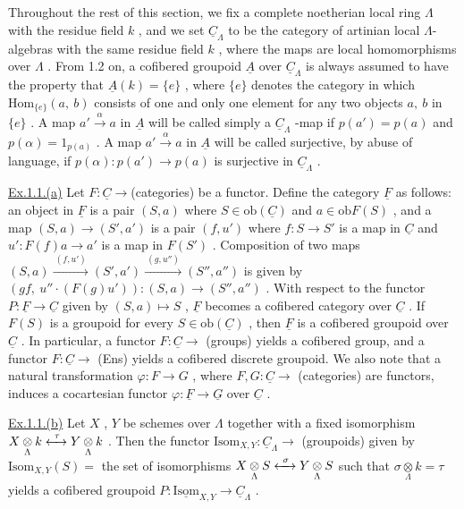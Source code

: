 Throughout the rest of this section, we fix a complete noetherian local ring  $\Lambda$  with the residue field  $k$  , and we set  $\underline{C}_{\Lambda}$  to be the category of artinian local  $\Lambda$-algebras with the same residue field  $k$  , where the maps are local homomorphisms over  $\Lambda$  . From 1.2 on, a cofibered groupoid  $\underline{A}$  over  $\underline{C}_{\Lambda}$ is always assumed to have the property that  $\underline{A}(k) = \{e\}$  , where  $\{e\}$  denotes the category in which  $\mathrm{Hom}_{\{e\}}(a,\ b)$  consists of one and only one element for any  two objects  $a,\ b$  in  $\{e\}$  . A map  $a' \xrightarrow{\ \alpha\ } a$  in  $\underline{A}$  will be called simply a $\underline{C}_{\Lambda}$ -map if  $p(a') = p(a)$  and  $p(\alpha) = 1_{p(a)}$  . A map  $a' \xrightarrow{\ \alpha\ } a$  in  $\underline{A}$  will be called surjective, by abuse of language, if  $p(\alpha) : p(a') \longrightarrow p(a)$  is surjective in  $\underline{C}_{\Lambda}$  .

\underline{Ex.1.1.(a)}  Let  $F : \underline{C} \longrightarrow$(categories) be a functor. Define the category $\underline{F}$  as follows:  an object in  $\underline{F}$  is a pair  $(S,a)$  where  $S \in \mathrm{ob}(\underline{C})$  and $a \in \mathrm{ob}F(S)$  , and a map  $(S,a) \to (S',a')$  is a pair  $(f,u')$  where  $f : S \to S'$  is a map in  $\underline{C}$  and  $u' : F(f)a \to a'$  is a map in  $F(S')$  . Composition of two maps $(S,a) \xrightarrow{\ (f,u')\ } (S',a') \xrightarrow{\ (g,u'')\ } (S'',a'')$  is given by $(gf,\ u''\cdot(F(g)u')) : (S,a) \to (S'',a'')$  . With respect to the functor  $P : \underline{F} \to \underline{C}$ given by  $(S,a) \mapsto S$  ,  $\underline{F}$  becomes a cofibered category over  $\underline{C}$  . If  $F(S)$  is a groupoid for every  $S \in \mathrm{ob}(\underline{C})$  , then  $\underline{F}$  is a cofibered groupoid over  $\underline{C}$  . In particular, a functor  $F : \underline{C} \to$ (groups) yields a cofibered group, and a functor $F : \underline{C} \to$ (Ens)  yields a cofibered discrete groupoid. We also note that a natural transformation  $\varphi : F \to G$  , where  $F,G : \underline{C} \to$ (categories) are functors, induces a cocartesian functor  $\varphi : \underline{F} \to \underline{G}$  over  $\underline{C}$  .

\underline{Ex.1.1.(b)}  Let  $X$  ,  $Y$  be schemes over  $\Lambda$  together with a fixed
isomorphism  $X \underset{\Lambda}{\otimes} k \xleftrightarrow{\ \tau\ } Y \underset{\Lambda}{\otimes} k$  . Then the functor  $\mathrm{Isom}_{X,Y} : \underline{C}_{\Lambda} \to$ (groupoids) given by  $\mathrm{Isom}_{X,Y}(S) =$ the set of isomorphisms  $X \underset{\Lambda}{\otimes} S \xleftrightarrow{\ \sigma\ } Y \underset{\Lambda}{\otimes} S$  such that $\sigma \underset{\Lambda}{\otimes} k = \tau$  yields a cofibered groupoid  $P : \underline{\mathrm{Isom}}_{X,Y} \to \underline{C}_{\Lambda}$  .

